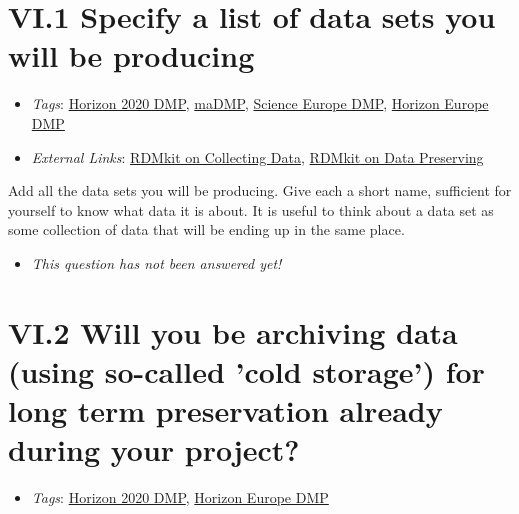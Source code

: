 \documentclass[a4paper,12pt]{report}
\begin{document}
\section*{\protect\textcolor{colorSecId}{VI.1} Specify a list of data sets you will be producing}

\label{d5b27482-b598-4b8c-b534-417d4ad27394.4e0c1edf-660c-4ebf-81f5-9fa959dead30}


\begin{itemize}
  \item \textit{Tags}: \ul{Horizon 2020 DMP}, \ul{maDMP}, \ul{Science Europe DMP}, \ul{Horizon Europe DMP}
  
  \item \textit{External Links}: \href{https://rdmkit.elixir-europe.org/collecting}{RDMkit on Collecting Data}, \href{https://rdmkit.elixir-europe.org/preserving}{RDMkit on Data Preserving}\end{itemize}


\noindent
\begin{markdown}
Add all the data sets you will be producing. Give each a short name, sufficient for yourself to know what data it is about. It is useful to think about a data set as some collection of data that will be ending up in the same place.
\end{markdown}



\begin{itemize}
  \item[\XSolidBrush] \textit{This question has not been answered yet!}
\end{itemize}
  


\section*{\protect\textcolor{colorSecId}{VI.2} Will you be archiving data (using so-called 'cold storage') for long term preservation already during your project?}

\label{d5b27482-b598-4b8c-b534-417d4ad27394.d5784d24-0e66-4821-bd62-a711fb6d7a40}


\begin{itemize}
  \item \textit{Tags}: \ul{Horizon 2020 DMP}, \ul{Horizon Europe DMP}
  \end{itemize}
\end{document}
